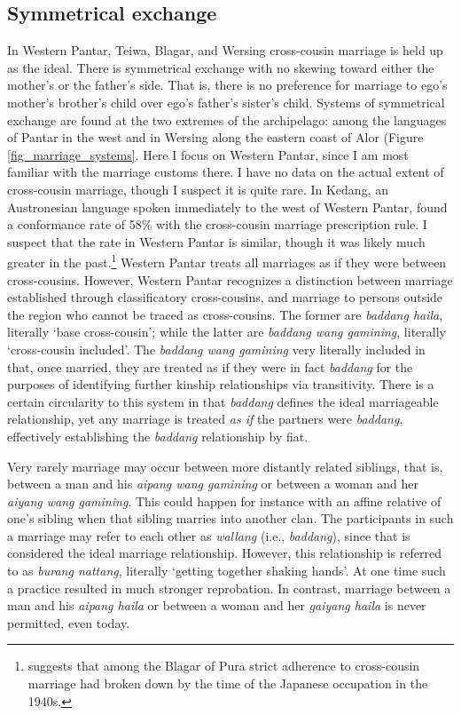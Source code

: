 \subsection{Symmetrical exchange}
In Western Pantar, Teiwa, Blagar, and Wersing cross-cousin marriage is held up as the ideal. There is symmetrical exchange with no skewing toward either the mother's or the father's side. That is, there is no preference for marriage to ego's mother's brother's child over ego's father's sister's child. Systems of symmetrical exchange are found at the two extremes of the archipelago: among the languages of Pantar in the west and in Wersing along the eastern coast of Alor (Figure \ref{fig_marriage_systems}. Here I focus on Western Pantar, since I am most familiar with the marriage customs there. I have no data on the actual extent of cross-cousin marriage, though I suspect it is quite rare. In Kedang, an Austronesian language spoken immediately to the west of Western Pantar, \citet[88]{Barnes1980} found a conformance rate of 58\% with the cross-cousin marriage prescription rule. I suspect that the rate in Western Pantar is similar, though it was likely much greater in the past.\footnote{{ }  \citet{Steinhauer2010} suggests that among the Blagar of Pura strict adherence to cross-cousin marriage had broken down by the time of the Japanese occupation in the 1940s.} Western Pantar treats all marriages as if they were between cross-cousins. However, Western Pantar recognizes a distinction between marriage established through classificatory cross-cousins, and marriage to persons outside the region who cannot be traced as cross-cousins. The former are \textit{baddang haila}, literally `base cross-cousin'; while the latter are \textit{baddang wang gamining}, literally `cross-cousin included'. The \textit{baddang wang gamining} very literally included in that, once married, they are treated as if they were in fact \textit{baddang} for the purposes of identifying further kinship relationships via transitivity. There is a certain circularity to this system in that \textit{baddang} defines the ideal marriageable relationship, yet any marriage is treated \textit{as if} the partners were \textit{baddang}, effectively establishing the \textit{baddang} relationship by fiat. 

Very rarely marriage may occur between more distantly related siblings, that is, between a man and his \textit{aipang wang gamining} or between a woman and her \textit{aiyang wang gamining}. This could happen for instance with an affine relative of one's sibling when that sibling marries into another clan. The participants in such a marriage may refer to each other as \textit{wallang} (i.e., \textit{baddang}), since that is considered the ideal marriage relationship. However, this relationship is referred to as \textit{burang nattang}, literally `getting together shaking hands'. At one time such a practice resulted in much stronger reprobation. In contrast, marriage between a man and his \textit{aipang haila} or between a woman and her \textit{gaiyang haila} is never permitted, even today.

